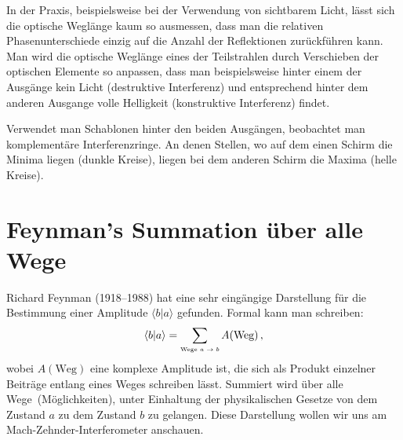 In der Praxis, beispielsweise bei der Verwendung von sichtbarem Licht, l\"asst sich die optische Wegl\"ange 
kaum so ausmessen, dass man die relativen Phasenunterschiede einzig auf die Anzahl der Reflektionen
zur\"uckf\"uhren kann. Man wird die optische Wegl\"ange eines der Teilstrahlen durch Verschieben der
optischen Elemente so anpassen, dass man beispielsweise hinter einem der Ausg\"ange kein Licht 
(destruktive Interferenz) und entsprechend hinter dem anderen Ausgange volle Helligkeit (konstruktive
Interferenz) findet. 

Verwendet man Schablonen hinter den beiden Ausg\"angen, beobachtet man komplement\"are
Interferenzringe. An denen Stellen, wo auf dem einen Schirm die Minima liegen (dunkle Kreise),
liegen bei dem anderen Schirm die Maxima (helle Kreise).

\section{Feynman's Summation \"uber alle Wege}

Richard Feynman (1918--1988)
hat eine sehr eing\"angige Darstellung f\"ur die Bestimmung einer
Amplitude $\langle b | a \rangle$ gefunden. Formal kann man schreiben:
\begin{equation}
       \langle b | a \rangle = \sum_{\mbox{\tiny Wege $a \rightarrow b$}}  A(\mbox{Weg}) \, ,
\end{equation}
wobei $A(\mbox{Weg})$ eine komplexe Amplitude ist, die sich als Produkt einzelner Beitr\"age entlang
eines Weges schreiben l\"asst. Summiert wird \"uber alle \glqq Wege\grqq\ (M\"oglichkeiten), unter
Einhaltung der physikalischen Gesetze von dem Zustand $a$ zu dem Zustand $b$ zu gelangen.
Diese Darstellung wollen wir uns am Mach-Zehnder-Interferometer anschauen. 

